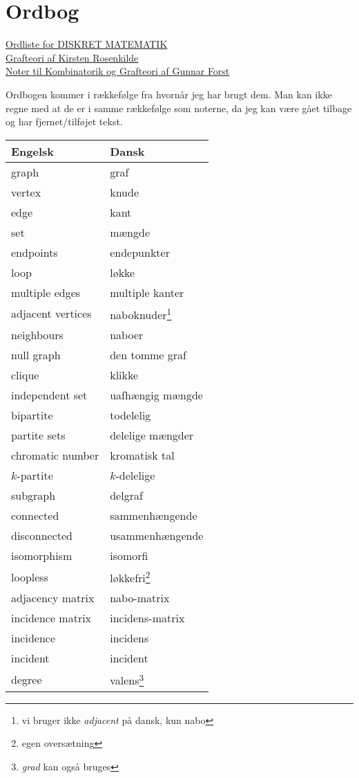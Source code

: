 \chapter{Ordbog}

\begin{note}[Kilder]
  \href{https://first.math.aau.dk/dan/2015/dmat/?file=dictionary.pdf}{Ordliste for DISKRET MATEMATIK}\\
  \noindent
  \href{https://www.georgmohr.dk/noter/grafteori2014.pdf}{Grafteori af Kirsten Rosenkilde}\\
  \noindent
  \href{https://noter.math.ku.dk/dis1-01.pdf}{Noter til Kombinatorik og Grafteori af Gunnar Forst}
\end{note}

Ordbogen kommer i rækkefølge fra hvornår jeg har brugt dem. Man kan ikke regne med at de er i samme rækkefølge som noterne, da jeg kan være gået tilbage og har fjernet/tilføjet tekst.

\begin{longtable}[c]{ll}
  \textbf{Engelsk} & \textbf{Dansk} \\ \hline \endfirsthead \endhead
  graph & graf \\
  vertex & knude \\
  edge & kant \\
  set & mængde \\
  endpoints & endepunkter \\
  loop & løkke \\
  multiple edges & multiple kanter \\
  adjacent vertices & naboknuder\footnote{vi bruger ikke \textit{adjacent} på dansk, kun nabo} \\
  neighbours & naboer \\
  null graph & den tomme graf \\
  clique & klikke \\
  independent set & uafhængig mængde \\
  bipartite & todelelig \\
  partite sets & delelige mængder \\
  chromatic number & kromatisk tal \\
  $k$-partite & $k$-delelige \\
  subgraph & delgraf \\
  connected & sammenhængende \\
  disconnected & usammenhængende \\
  isomorphism & isomorfi \\
  loopless & løkkefri\footnote{egen oversætning}\\
  adjacency matrix & nabo-matrix \\
  incidence matrix & incidens-matrix \\
  incidence & incidens \\
  incident & incident \\
  degree & valens\footnote{\textit{grad} kan også bruges} \\
\end{longtable}

